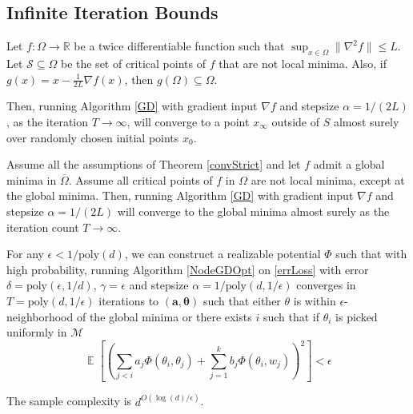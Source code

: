 \documentclass[a4paper,UKenglish]{lipics-v2016}
\newcommand{\poly}{\mathrm{poly}}
\newcommand{\R}{{\mathbb{R}}}
\DeclareMathOperator*{\expt}{\mathbb{E}}
\begin{document}
% 

























\subsection{Infinite Iteration Bounds} 
\label{InfIter}


\begin{theorem}\cite{lee2016gradient, PanageasP16}\label{convStrict}
  Let $f :\Omega \to \R$ be a twice differentiable function such that
  $\sup_{x \in \Omega} \|\nabla^2 f\| \leq L$. Let
  $\mathcal{S} \subseteq \Omega$ be the set of critical points of $f$
  that are not local minima. Also, if
  $g(x) = x - \frac{1}{2L} \nabla f(x)$, then
  $g(\Omega) \subseteq \Omega$.

  Then, running Algorithm \ref{GD} with gradient input $\nabla f$ and
  stepsize $\alpha = 1/(2L)$, as the iteration $T \to\infty$, will
  converge to a point $x_\infty$ outside of $S$ almost surely over
  randomly chosen initial points $x_0$.
\end{theorem}

\begin{corollary}
Assume all the assumptions of Theorem \ref{convStrict} and let $f$ admit a global minima in $\overline{\Omega}$. Assume all critical points of $f$ in $\Omega$ are not local minima, except at the global minima. Then, running Algorithm \ref{GD} with gradient input $\nabla f$ and stepsize $\alpha = 1/(2L)$ will converge to the global minima almost surely as the iteration count $T \to\infty$.
\end{corollary}
\fi


\begin{theorem}
For any $\epsilon < 1/\poly(d)$, we can construct a realizable potential $\Phi$ such that with high probability, running Algorithm \ref{NodeGDOpt} on \eqref{errLoss} with error $\delta = \poly(\epsilon,1/d)$, $\gamma = \epsilon$ and stepsize $\alpha = 1/\poly(d,1/\epsilon)$ converges in $T = \poly(d, 1/\epsilon)$ iterations to $(\boldsymbol{a,\theta})$ such that either  $\theta$ is within $\epsilon$-neighborhood of the global minima or there exists $i$ such that if $\theta_i$ is picked uniformly in $\mathcal{M}$
%
\[ \expt\left[\left( \sum_{j < i} a_j \Phi(\theta_i,\theta_j) + \sum_{j=1}^k b_j \Phi(\theta_i,w_j)\right)^2\right] < \epsilon\]

The sample complexity is $d^{O(\log(d)/\epsilon)}$.
\end{theorem}
\end{document}
